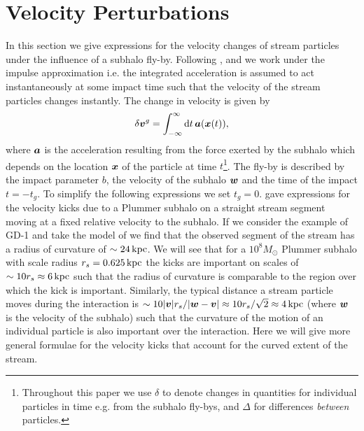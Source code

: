 \documentclass[useAMS,usenatbib,fleqn,a4paper]{mn2e}
\def\d{{\rm d}}
\def\kpc{\,{\rm kpc}}
\newcommand{\bs}[1]{\bmath{#1}}
\begin{document}
\section{Velocity Perturbations}\label{Sect::Formalism}
In this section we give expressions for the velocity changes of stream particles under the influence of a subhalo fly-by. Following \cite{YoonJohnstonHogg}, \cite{Carlberg2013} and \cite{ErkalBelokurov2015} we work under the impulse approximation i.e. the integrated acceleration is assumed to act instantaneously at some impact time such that the velocity of the stream particles changes instantly. The change in velocity is given by
\begin{equation}
\delta\bs{v}^g = \int_{-\infty}^{\infty} \d t\,\bs{a}(\bs{x}(t)),
\end{equation}
where $\bs{a}$ is the acceleration resulting from the force exerted by the subhalo which depends on the location $\bs{x}$ of the particle at time $t$\footnote{Throughout this paper we use $\delta$ to denote changes in quantities for individual particles in time e.g. from the subhalo fly-bys, and $\Delta$ for differences \emph{between} particles.}. The fly-by is described by the impact parameter $b$, the velocity of the subhalo $\bs{w}$ and the time of the impact $t=-t_g$. To simplify the following expressions we set $t_g=0$. \cite{ErkalBelokurov2015} gave expressions for the velocity kicks due to a Plummer subhalo on a straight stream segment moving at a fixed relative velocity to the subhalo. If we consider the example of GD-1 and take the model of \cite{Koposov2010} we find that the observed segment of the stream has a radius of curvature of $\sim24\kpc$. We will see that for a $10^8M_\odot$ Plummer subhalo with scale radius $r_s=0.625\kpc$ the kicks are important on scales of $\sim10r_s\approx6\kpc$ such that the radius of curvature is comparable to the region over which the kick is important. Similarly, the typical distance a stream particle moves during the interaction is $\sim10|\bs{v}|r_s/|\bs{w}-\bs{v}|\approx10r_s/\sqrt{2}\approx4\kpc$ (where $\bs{w}$ is the velocity of the subhalo) such that the curvature of the motion of an individual particle is also important over the interaction. Here we will give more general formulae for the velocity kicks that account for the curved extent of the stream.
\end{document}
